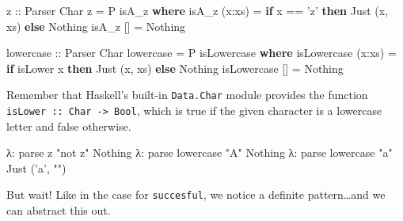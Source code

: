 \documentclass[]{article}
\newenvironment{Shaded}{}{}
\newcommand{\KeywordTok}[1]{\textcolor[rgb]{0.00,0.44,0.13}{\textbf{{#1}}}}
\newcommand{\DataTypeTok}[1]{\textcolor[rgb]{0.56,0.13,0.00}{{#1}}}
\newcommand{\CharTok}[1]{\textcolor[rgb]{0.25,0.44,0.63}{{#1}}}
\newcommand{\StringTok}[1]{\textcolor[rgb]{0.25,0.44,0.63}{{#1}}}
\newcommand{\OtherTok}[1]{\textcolor[rgb]{0.00,0.44,0.13}{{#1}}}
\newcommand{\FunctionTok}[1]{\textcolor[rgb]{0.02,0.16,0.49}{{#1}}}
\newcommand{\NormalTok}[1]{{#1}}
\begin{document}
\begin{Shaded}
\begin{Highlighting}[]
\OtherTok{z ::} \DataTypeTok{Parser} \DataTypeTok{Char}
\NormalTok{z }\FunctionTok{=} \DataTypeTok{P} \NormalTok{isA_z}
    \KeywordTok{where}
        \NormalTok{isA_z (x}\FunctionTok{:}\NormalTok{xs) }\FunctionTok{=}  \KeywordTok{if} \NormalTok{x }\FunctionTok{==} \CharTok{'z'}
                            \KeywordTok{then} \DataTypeTok{Just} \NormalTok{(x, xs)}
                            \KeywordTok{else} \DataTypeTok{Nothing}
        \NormalTok{isA_z []     }\FunctionTok{=}  \DataTypeTok{Nothing}

\OtherTok{lowercase ::} \DataTypeTok{Parser} \DataTypeTok{Char}
\NormalTok{lowercase }\FunctionTok{=} \DataTypeTok{P} \NormalTok{isLowercase}
    \KeywordTok{where}
        \NormalTok{isLowercase (x}\FunctionTok{:}\NormalTok{xs)  }\FunctionTok{=}   \KeywordTok{if} \NormalTok{isLower x}
                                    \KeywordTok{then} \DataTypeTok{Just} \NormalTok{(x, xs)}
                                    \KeywordTok{else} \DataTypeTok{Nothing}
        \NormalTok{isLowercase []      }\FunctionTok{=}   \DataTypeTok{Nothing}
\end{Highlighting}
\end{Shaded}

Remember that Haskell's built-in \texttt{Data.Char} module provides the function
\texttt{isLower\ ::\ Char\ -\textgreater{}\ Bool}, which is true if the given
character is a lowercase letter and false otherwise.

\begin{Shaded}
\begin{Highlighting}[]
\NormalTok{λ}\FunctionTok{:} \NormalTok{parse z }\StringTok{"not z"}
\DataTypeTok{Nothing}
\NormalTok{λ}\FunctionTok{:} \NormalTok{parse lowercase }\StringTok{"A"}
\DataTypeTok{Nothing}
\NormalTok{λ}\FunctionTok{:} \NormalTok{parse lowercase }\StringTok{"a"}
\DataTypeTok{Just} \NormalTok{(}\CharTok{'a'}\NormalTok{, }\StringTok{""}\NormalTok{)}
\end{Highlighting}
\end{Shaded}

But wait! Like in the case for \texttt{succesful}, we notice a definite
pattern\ldots{}and we can abstract this out.
\end{document}
